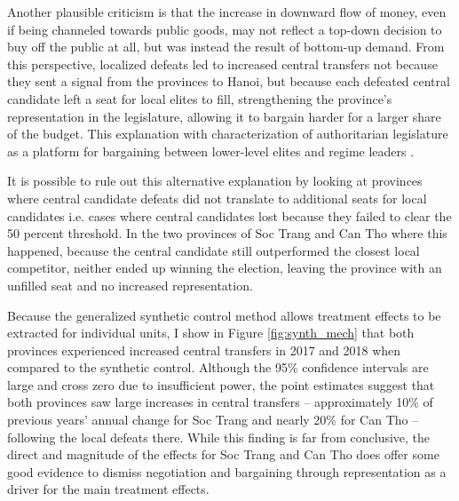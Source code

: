 \documentclass[12pt]{article}
\newcommand{\1}{\mathbbm{1}}
\begin{document}
Another plausible criticism is that the increase in downward flow of money, even if being channeled towards public goods, may not reflect a top-down decision to buy off the public at all, but was instead the result of bottom-up demand. From this perspective, localized defeats led to increased central transfers not because they sent a signal from the provinces to Hanoi, but because each defeated central candidate left a seat for local elites to fill, strengthening the province's representation in the legislature, allowing it to bargain harder for a larger share of the budget. This explanation with characterization of authoritarian legislature as a platform for bargaining between lower-level elites and regime leaders \citep[e.g][]{Magaloni2008}. 

It is possible to rule out this alternative explanation by looking at provinces where central candidate defeats did not translate to additional seats for local candidates i.e. cases where central candidates lost because they failed to clear the 50 percent threshold. In the two provinces of Soc Trang and Can Tho where this happened, because the central candidate still outperformed the closest local competitor, neither ended up winning the election, leaving the province with an unfilled seat and no increased representation. 

Because the generalized synthetic control method allows treatment effects to be extracted for individual units, I show in Figure \ref{fig:synth_mech} that both provinces experienced increased central transfers in 2017 and 2018 when compared to the synthetic control. Although the 95\% confidence intervals are large and cross zero due to insufficient power, the point estimates suggest that both provinces saw large increases in central transfers -- approximately 10\% of previous years' annual change for Soc Trang and nearly 20\% for Can Tho -- following the local defeats there. While this finding is far from conclusive, the direct and magnitude of the effects for Soc Trang and Can Tho does offer some good evidence to dismiss negotiation and bargaining through representation as a driver for the main treatment effects.
\end{document}
